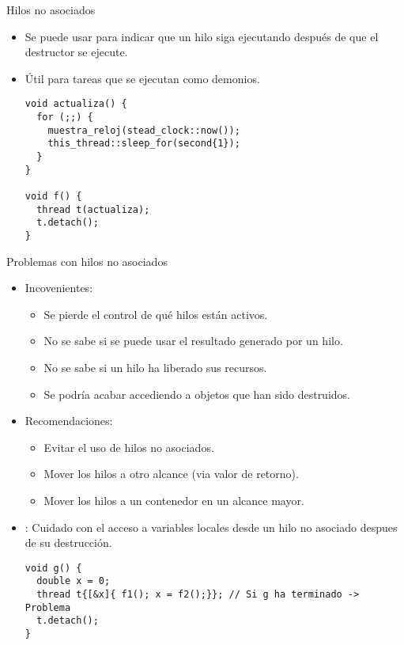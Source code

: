 \begin{frame}[t,fragile]{Hilos no asociados}
\begin{itemize}
  \item Se puede usar  para indicar que un hilo siga ejecutando 
        después de que el destructor se ejecute.
  \item Útil para tareas que se ejecutan como demonios.
\begin{lstlisting}
void actualiza() {
  for (;;) {
    muestra_reloj(stead_clock::now());
    this_thread::sleep_for(second{1});
  }
}

void f() {
  thread t(actualiza);
  t.detach();
}
\end{lstlisting}
\end{itemize}
\end{frame}

\begin{frame}[t,fragile]{Problemas con hilos no asociados}
\begin{itemize}
  \item Incovenientes:
    \begin{itemize}
      \item Se pierde el control de qué hilos están activos.
      \item No se sabe si se puede usar el resultado generado por un hilo.
      \item No se sabe si un hilo ha liberado sus recursos.
      \item Se podría acabar accediendo a objetos que han sido destruidos.
    \end{itemize}
  \item Recomendaciones:
    \begin{itemize}
      \item Evitar el uso de hilos no asociados.
      \item Mover los hilos a otro alcance (via valor de retorno).
      \item Mover los hilos a un contenedor en un alcance mayor.
    \end{itemize}
  \item {}: Cuidado con el acceso a variables locales desde un hilo no asociado despues de su destrucción.
\begin{lstlisting}
void g() {
  double x = 0;
  thread t{[&x]{ f1(); x = f2();}}; // Si g ha terminado -> Problema
  t.detach();
}
\end{lstlisting}
\end{itemize}
\end{frame}


